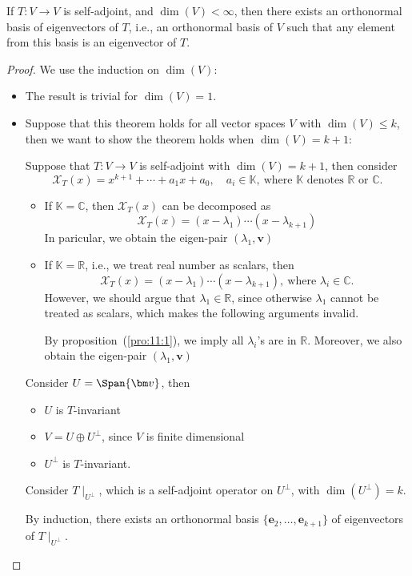 \begin{theorem}\label{the:11:1}
If $T:V\to V$ is self-adjoint, and $\dim(V)<\infty$, then there exists an orthonormal basis of eigenvectors of $T$, i.e., an orthonormal basis of $V$ such that any element from this basis is an eigenvector of $T$.
\end{theorem}
\begin{proof}
We use the induction on $\dim(V)$:
\begin{itemize}
\item
The result is trivial for $\dim(V)=1$.
\item
Suppose that this theorem holds for all vector spaces $V$ with $\dim(V)\le k$, then we want to show the theorem holds when $\dim(V)=k+1$:

Suppose that $T:V\to V$ is self-adjoint with $\dim(V)=k+1$, then consider 
\[
\mathcal{X}_T(x)=x^{k+1}+\cdots+a_1x+a_0,\quad a_i\in\mathbb{K},\ \text{where $\mathbb{K}$ denotes $\mathbb{R}$ or $\mathbb{C}$.}
\]
\begin{itemize}
\item
If $\mathbb{K}=\mathbb{C}$, then $\mathcal{X}_T(x)$ can be decomposed as
\[
\mathcal{X}_T(x)=(x-\lambda_1)\cdots(x-\lambda_{k+1})
\]
In paricular, we obtain the eigen-pair $(\lambda_1,\bm v)$
\item
If $\mathbb{K}=\mathbb{R}$, i.e., we treat real number as scalars, then
\[
\mathcal{X}_T(x)=(x-\lambda_1)\cdots(x-\lambda_{k+1}),\
\text{where $\lambda_i\in\mathbb{C}$}.
\]
However, we should argue that $\lambda_1\in\mathbb{R}$, since otherwise $\lambda_1$ cannot be treated as scalars, which makes the following arguments invalid.

By proposition~(\ref{pro:11:1}), we imply all $\lambda_i$'s are in $\mathbb{R}$.
Moreover, we also obtain the eigen-pair $(\lambda_1,\bm v)$
\end{itemize}

Consider $U=\Span\{\bm v\}$, then
\begin{itemize}
\item
$U$ is $T$-invariant
\item
$V=U\oplus U^\perp$, since $V$ is finite dimensional
\item
$U^\perp$ is $T$-invariant.
\end{itemize}
Consider $T\mid_{U^\perp}$, which is a self-adjoint operator on $U^\perp$, with $\dim(U^\perp)=k$. 

By induction, there exists an orthonormal basis $\{\bm e_2,\dots,\bm e_{k+1}\}$ of eigenvectors of $T\mid_{U^\perp}$.


\end{itemize}
\end{proof}
